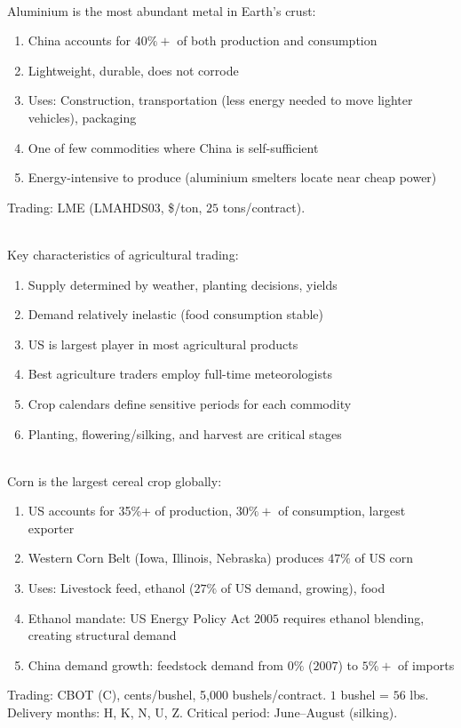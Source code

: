 \begin{remark} \\
Aluminium is the most abundant metal in Earth's crust:
\begin{enumerate}[label=\roman*.]
\setlength{\itemsep}{0pt}
\item China accounts for $40\%+$ of both production and consumption
\item Lightweight, durable, does not corrode
\item Uses: Construction, transportation (less energy needed to move lighter vehicles), packaging
\item One of few commodities where China is self-sufficient
\item Energy-intensive to produce (aluminium smelters locate near cheap power)
\end{enumerate}
Trading: LME (LMAHDS03, \$/ton, $25$ tons/contract).
\end{remark}

\begin{remark} \\
Key characteristics of agricultural trading:
\begin{enumerate}[label=\roman*.]
\setlength{\itemsep}{0pt}
\item Supply determined by weather, planting decisions, yields
\item Demand relatively inelastic (food consumption stable)
\item US is largest player in most agricultural products
\item Best agriculture traders employ full-time meteorologists
\item Crop calendars define sensitive periods for each commodity
\item Planting, flowering/silking, and harvest are critical stages
\end{enumerate}
\end{remark}

\begin{remark} \\
Corn is the largest cereal crop globally:
\begin{enumerate}[label=\roman*.]
\setlength{\itemsep}{0pt}
\item US accounts for 35\%+ of production, $30\%+$ of consumption, largest exporter
\item Western Corn Belt (Iowa, Illinois, Nebraska) produces $47\%$ of US corn
\item Uses: Livestock feed, ethanol ($27\%$ of US demand, growing), food
\item Ethanol mandate: US Energy Policy Act $2005$ requires ethanol blending, creating structural demand
\item China demand growth: feedstock demand from $0\%$ ($2007$) to $5\%+$ of imports
\end{enumerate}
Trading: CBOT (C), cents/bushel, 5,000 bushels/contract. $1$ bushel = $56$ lbs.\\
Delivery months: H, K, N, U, Z. Critical period: June--August (silking).
\end{remark}


